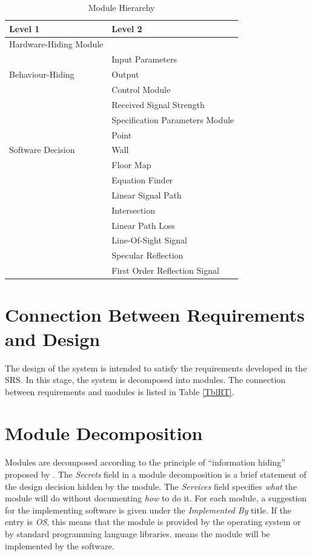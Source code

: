 \documentclass[12pt, titlepage]{article}
\begin{document}
\begin{table}[h!]
\centering
\begin{tabular}{p{} p{}}
\toprule
\textbf{Level 1} & \textbf{Level 2}\\
\midrule

{Hardware-Hiding Module} & ~ \\
\midrule

\multirow{3}{0.3\textwidth}{Behaviour-Hiding} & Input Parameters\\
& Output\\
& Control Module\\
& Received Signal Strength\\
& Specification Parameters Module\\
\midrule

\multirow{3}{0.3\textwidth}{Software Decision} & Point\\
& Wall\\
& Floor Map\\
& Equation Finder\\
& Linear Signal Path\\
& Intersection\\
& Linear Path Loss\\
& Line-Of-Sight Signal\\
& Specular Reflection\\
& First Order Reflection Signal\\
\bottomrule

\end{tabular}
\caption{Module Hierarchy}
\label{TblMH}
\end{table}

\section{Connection Between Requirements and Design} \label{SecConnection}

The design of the system is intended to satisfy the requirements developed in
the SRS. In this stage, the system is decomposed into modules. The connection
between requirements and modules is listed in Table \ref{TblRT}.

\section{Module Decomposition} \label{SecMD}

Modules are decomposed according to the principle of ``information hiding''
proposed by \citet{ParnasEtAl1984}. The \emph{Secrets} field in a module
decomposition is a brief statement of the design decision hidden by the
module. The \emph{Services} field specifies \emph{what} the module will do
without documenting \emph{how} to do it. For each module, a suggestion for the
implementing software is given under the \emph{Implemented By} title. If the
entry is \emph{OS}, this means that the module is provided by the operating
system or by standard programming language libraries.  \emph{\progname{}} means the
module will be implemented by the \progname{} software.
\end{document}
